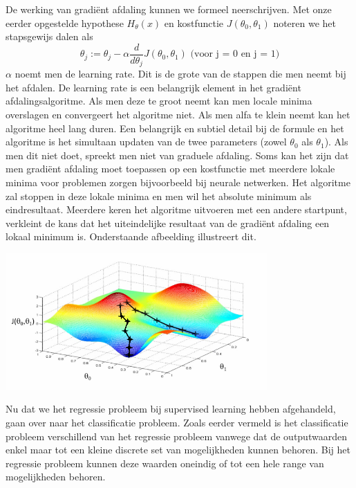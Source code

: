 \newline
De werking van gradi\"ent afdaling kunnen we formeel neerschrijven. Met onze eerder opgestelde hypothese $H_{\theta}(x)$ en kostfunctie $J(\theta_{0},\theta_{1})$ noteren we het stapsgewijs dalen als \\
\[ \theta_{j} := \theta_{j} - \alpha\frac{d}{d\theta_{j}}J(\theta_{0},\theta_{1})   \text{  (voor j = 0 en j = 1)}\] 
\newline
$\alpha$ noemt men de learning rate. Dit is de grote van de stappen die men neemt bij het afdalen. De learning rate is een belangrijk element in het gradi\"ent afdalingsalgoritme. Als men deze te groot neemt kan men locale minima overslagen en convergeert het algoritme niet. Als men alfa te klein neemt kan het algoritme heel lang duren. 
\newline
Een belangrijk en subtiel detail bij de formule en het algoritme is het simultaan updaten van de twee parameters (zowel $\theta_{0}$ als $\theta_{1}$). Als men dit niet doet, spreekt men niet van graduele afdaling.
\newline
Soms kan het zijn dat men gradi\"ent afdaling moet toepassen op een kostfunctie met meerdere lokale minima voor problemen zorgen bijvoorbeeld bij neurale netwerken. Het algoritme zal stoppen in deze lokale minima en men wil het absolute minimum als eindresultaat. Meerdere keren het algoritme uitvoeren met een andere startpunt, verkleint de kans dat het uiteindelijke resultaat van de gradi\"ent afdaling een lokaal minimum is. Onderstaande afbeelding illustreert dit.

\begin{center}
  \includegraphics[width=10cm]{3d_plot}
\end{center}
\newline
Nu dat we het regressie probleem bij supervised learning hebben afgehandeld, gaan over naar het classificatie probleem. Zoals eerder vermeld is het classificatie probleem verschillend van het regressie probleem vanwege dat de outputwaarden enkel maar tot een kleine discrete set van mogelijkheden kunnen behoren. Bij het regressie probleem kunnen deze waarden oneindig of tot een hele range van mogelijkheden behoren.

